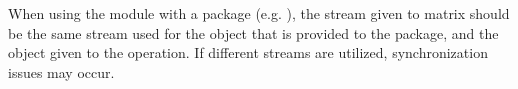 
{\warn} When using the  module with a {\sundials}
package (e.g. {\cvode}), the stream given to matrix should be the same
stream used for the {\nvector} object that is provided to the package,
and the {\nvector} object given to the  operation. If different
streams are utilized, synchronization issues may occur.
